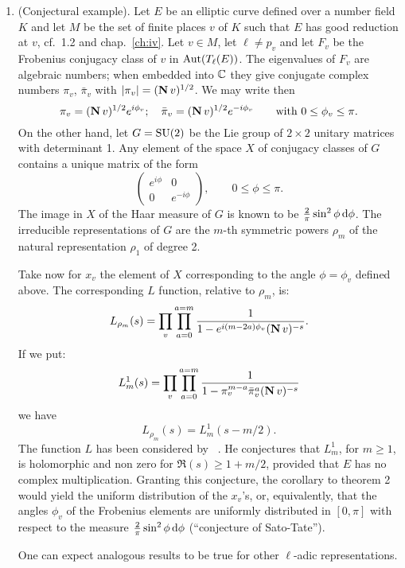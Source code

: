 \begin{subappendices}
\begin{enumerate}[resume*=ex_IA3]
\item (Conjectural example).
	Let $E$ be an elliptic curve defined over a number field $K$ and let
	$M$ be the set of finite places $v$ of $K$ such that $E$ has good
	reduction at $v$, cf.\ 1.2 and chap.~\ref{ch:iv}.  Let $v \in M$, let
	$\ell \ne p_v$ and let $F_v$ be the Frobenius conjugacy class of $v$ in
	$\operatorname{Aut}(T_\ell(E))$. The eigenvalues of $F_v$ are algebraic numbers; when
	embedded into $\mathbb{C}$ they give conjugate complex numbers $\pi_v$,
	$\bar{\pi}_v$ with $|\pi_v| = (\operatorname{\mathbf{N}} v)^{1/2}$.
	We may write then
	\[
		\pi_v = (\operatorname{\mathbf{N}} v)^{1/2} e^{i \phi_v}; \quad
		\bar{\pi}_v = (\operatorname{\mathbf{N}} v)^{1/2} e^{-i \phi_v} \qquad
		\text{with } 0 \le \phi_v \le \pi.
	\]
	On the other hand, let $G = \operatorname{SU}(2)$ be the Lie group of $2 \times 2$
	unitary matrices with determinant 1. Any element of the space $X$ of
	conjugacy classes of $G$ contains a unique matrix of the form
	\[
		\begin{pmatrix}
			e^{i \phi} & 0 \\
			0 & e^{-i \phi}
		\end{pmatrix}, \qquad 0 \le \phi \le \pi.
	\]
	The image in $X$ of the Haar measure of $G$ is known to be
	$\frac{2}{\pi}\sin^2 \phi \, \mathrm{d}\phi$.  The irreducible
	representations of $G$ are the $m$-th symmetric powers $\rho_m$ of the
	natural representation $\rho_1$ of degree 2.

	Take now for $x_v$ the element of $X$ corresponding to the angle
	$\phi = \phi_v$ defined above. The corresponding $L$ function,
	relative to $\rho_m$, is:
	\[
		L_{\rho_m}(s) = \prod_{v} \prod_{a=0}^{a=m} \frac{1}{ 1 -
		e^{i(m - 2a)\phi_v} (\operatorname{\mathbf{N}} v)^{-s} }.
	\]
	If we put:
	\[
		L_m^1(s) = \prod_{v} \prod_{a=0}^{a=m} \frac{1}{ 1 -
		\pi_v^{m-a} \bar{\pi}_v^a (\operatorname{\mathbf{N}} v)^{-s} }
	\]
	\dpage
	we have
	\[
		L_{\rho_m}(s) = L_m^1(s - m/2).
	\]
	The function $L$ has been considered by \citeauthor{36}~\cite{36}. He
	conjectures that $L_m^1$, for $m \ge 1$, is holomorphic and non zero
	for $\Re(s) \ge 1 + m/2$, provided that $E$ has no complex
	multiplication. Granting this conjecture, the corollary to theorem 2
	would yield the uniform distribution of the $x_v$'s, or, equivalently,
	that the angles $\phi_v$ of the Frobenius elements are uniformly
	distributed in $[0, \pi]$ with respect to the measure
	$\frac{2}{\pi}\sin^2 \phi \, \mathrm{d}\phi$ (``conjecture of
	Sato-Tate'').

	One can expect analogous results to be true for other $\ell$-adic
	representations.
\end{enumerate}


\end{subappendices}
